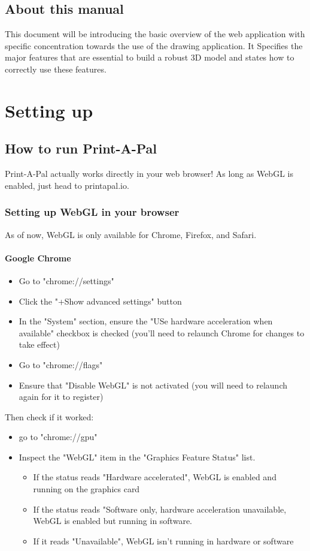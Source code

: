 \documentclass{report}
\begin{document}
\section{About this manual}

This document will be introducing the basic overview of the web application with specific concentration towards the use of the drawing application. It Specifies the major features that are essential to build a robust 3D model and states how to correctly use these features. 

\chapter{Setting up}
\section{How to run Print-A-Pal}
Print-A-Pal actually works directly in your web browser! As long as WebGL is enabled, just head to printapal.io.
\subsection{Setting up WebGL in your browser}
As of now, WebGL is only available for Chrome, Firefox, and Safari.
\subsubsection{Google Chrome}
\begin{itemize}
  \item Go to "chrome://settings"
  \item Click the "+Show advanced settings" button
  \item In the "System" section, ensure the "USe hardware acceleration when available" checkbox is checked (you'll need to relaunch Chrome for changes to take effect)
  \item Go to "chrome://flags"
  \item Ensure that "Disable WebGL" is not activated (you will need to relaunch again for it to register) 
\end{itemize}
Then check if it worked:
\begin{itemize}
    \item go to "chrome://gpu" 
    \item Inspect the "WebGL" item in the "Graphics Feature Status" list.  
    \begin{itemize}
    \item If the status reads "Hardware accelerated", WebGL is enabled and running on the graphics card
    \item If the status reads "Software only, hardware acceleration unavailable, WebGL is enabled but running in software.
    \item If it reads "Unavailable", WebGL isn't running in hardware or software
    \end{itemize}  
\end{itemize}
\end{document}
